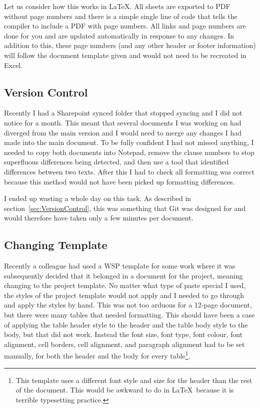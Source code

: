 Let us consider how this works in \LaTeX. All sheets are exported to PDF without page numbers and there is a simple single line of code that tells the compiler to include a PDF with page numbers. All links and page numbers are done for you and are updated automatically in response to any changes. In addition to this, these page numbers (and any other header or footer information) will follow the document template given and would not need to be recreated in Excel.

\subsection{Version Control}
\label{subsec:VersionControl}

Recently I had a Sharepoint synced folder that stopped syncing and I did not notice for a month. This meant that several documents I was working on had diverged from the main version and I would need to merge any changes I had made into the main document. To be fully confident I had not missed anything, I needed to copy both documents into Notepad, remove the clause numbers to stop superfluous differences being detected, and then use a tool that identified differences between two texts. After this I had to check all formatting was correct because this method would not have been picked up formatting differences.

I ended up wasting a whole day on this task. As described in section~\ref{sec:VersionControl}, this was something that Git was designed for and would therefore have taken only a few minutes per document.

\subsection{Changing Template}

Recently a colleague had used a WSP template for some work where it was subsequently decided that it belonged in a document for the project, meaning changing to the project template. No matter what type of paste special I used, the styles of the project template would not apply and I needed to go through and apply the styles by hand. This was not too arduous for a 12-page document, but there were many tables that needed formatting. This should have been a case of applying the table header style to the header and the table body style to the body, but that did not work. Instead the font size, font type, font colour, font alignment, cell borders, cell alignment, and paragraph alignment had to be set manually, for both the header and the body for every table\footnote{This template uses a different font style and size for the header than the rest of the document. This would be awkward to do in \LaTeX\ because it is terrible typesetting practice.}.

